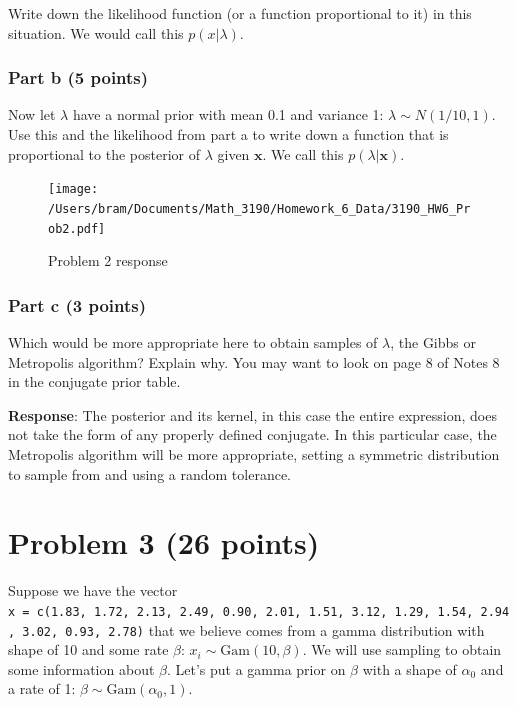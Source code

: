 \documentclass[
]{article}
\begin{document}
Write down the likelihood function (or a function proportional to it) in
this situation. We would call this \(p(x|\lambda)\).

\hypertarget{part-b-5-points}{%
\subsubsection{Part b (5 points)}\label{part-b-5-points}}

Now let \(\lambda\) have a normal prior with mean 0.1 and variance 1:
\(\lambda\sim N(1/10, 1)\). Use this and the likelihood from part a to
write down a function that is proportional to the posterior of
\(\lambda\) given \(\boldsymbol{x}\). We call this
\(p(\lambda|\boldsymbol{x})\).

\begin{figure}
\centering
\texttt{[image: /Users/bram/Documents/Math\_3190/Homework\_6\_Data/3190\_HW6\_Prob2.pdf]}
\caption{Problem 2 response}
\end{figure}

\hypertarget{part-c-3-points}{%
\subsubsection{Part c (3 points)}\label{part-c-3-points}}

Which would be more appropriate here to obtain samples of \(\lambda\),
the Gibbs or Metropolis algorithm? Explain why. You may want to look on
page 8 of Notes 8 in the conjugate prior table.

\textbf{Response}: The posterior and its kernel, in this case the entire
expression, does not take the form of any properly defined conjugate. In
this particular case, the Metropolis algorithm will be more appropriate,
setting a symmetric distribution to sample from and using a random
tolerance.

\hypertarget{problem-3-26-points}{%
\section{Problem 3 (26 points)}\label{problem-3-26-points}}

Suppose we have the vector
\texttt{x\ =\ c(1.83,\ 1.72,\ 2.13,\ 2.49,\ 0.90,\ 2.01,\ 1.51,\ 3.12,\ 1.29,\ 1.54,\ 2.94,\ 3.02,\ 0.93,\ 2.78)}
that we believe comes from a gamma distribution with shape of 10 and
some rate \(\beta\): \(x_i\sim\text{Gam}(10,\beta)\). We will use
sampling to obtain some information about \(\beta\). Let's put a gamma
prior on \(\beta\) with a shape of \(\alpha_0\) and a rate of 1:
\(\beta\sim\text{Gam}(\alpha_0,1)\).
\end{document}
